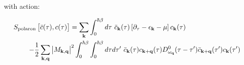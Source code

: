 with action:

\begin{equation}
    \begin{aligned}
        S_{\text{polaron}}\left[\Bar{c}(\tau), c(\tau)\right] =  \sum_{\vb{k}} &\int_0^{\hbar\beta} d\tau\ \Bar{c}_{\vb{k}}(\tau) \left[\partial_{\tau} - \epsilon_{\vb{k}} - \mu \right] c_{\vb{k}}(\tau) \\
        - \frac{1}{2} \sum_{\vb{k}, \vb{q}} \abs{M_{\vb{k}, \vb{q}}}^2 \int_0^{\hbar\beta} &\int_0^{\hbar\beta} d\tau d\tau'\ \Bar{c}_{\vb{k}}(\tau) c_{\vb{k}+\vb{q}}(\tau) D^0_{\omega_{\vb{q}}}(\tau - \tau') \Bar{c}_{\vb{k}+\vb{q}}(\tau') c_{\vb{k}}(\tau') 
    \end{aligned}
\end{equation}